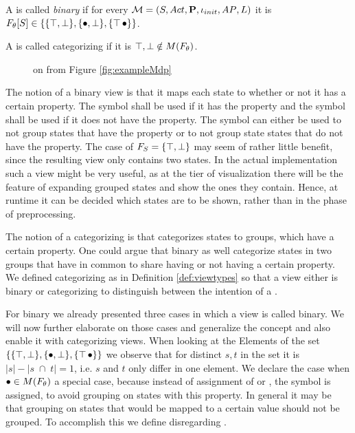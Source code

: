 \documentclass[preview]{standalone}
\begin{document}
\begin{definition}
	\sloppy
	A \viewN \view is called \emph{binary} if for every \chgphN $\chgph = \chgphtuple$ it is ${\grpfct}[\states] \in \{\{\hasppty, \notppty\}, \{\remelem, \notppty\}, \{\hasppty\, \remelem\}\}$. 
	
	\noindent
	A \viewN \view is called categorizing if it is $\hasppty, \notppty \notin M(\grpfct)$.%
	\label{def:viewtypes}
\end{definition}

\begin{figure}[t]
	\centering 
	\caption{\viewNC \view on \chgphN \chgph from Figure \ref{fig:exampleMdp}}
	\label{fig:exampleView}  
\end{figure}

The notion of a binary view is that it maps each state to whether or not it has a certain property. The symbol \hasppty shall be used if it has the property and the symbol \notppty shall be used if it does not have the property. The symbol \remelem can either be used to not group states that have the property or to not group state states that do not have the property. The case of $\grpfct[\states] = \{\hasppty, \notppty\}$ may seem of rather little benefit, since the resulting view only contains two states. In the actual implementation such a view might be very useful, as at the tier of visualization there will be the feature of expanding grouped states and show the ones they contain. Hence, at runtime it can be decided which states are to be shown, rather than in the phase of preprocessing.

The notion of a categorizing \viewN is that categorizes states to groups, which have a certain property. One could argue that binary \viewsN as well categorize states in two groups that have in common to share having or not having a certain property. We defined categorizing \viewsN as in Definition \ref{def:viewtypes} so that a view either is binary or categorizing to distinguish between the intention of a \viewN.

For binary \view we already presented three cases in which a view is called binary. We will now further elaborate on those cases and generalize the concept and also enable it with categorizing views. When looking at the Elements of the set $\{\{\hasppty, \notppty\}, \{\remelem, \notppty\}, \{\hasppty\, \remelem\}\}$ we observe that for distinct $s,t$ in the set it is $|s|-|s \; \cap \; t| = 1$, i.e. $s$ and $t$ only differ in one element. We declare the case when $\remelem \in M(\grpfct)$ a special case, because instead of assignment of \hasppty or \notppty, the symbol \remelem is assigned, to avoid grouping on states with this property. In general it may be that grouping on states that would be mapped to a certain value should not be grouped. To accomplish this we define disregarding \viewsN.
\end{document}
